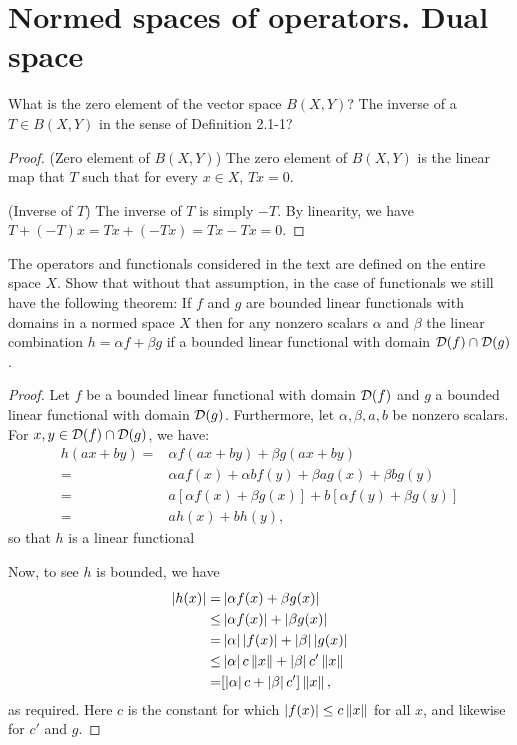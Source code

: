 \section{Normed spaces of operators. Dual space}


\begin{exercise}{1}
What is the zero element of the vector space $B(X,Y)$?
The inverse of a $T\in B(X,Y)$ in the sense of Definition 2.1-1?
\end{exercise}
\begin{proof}
(Zero element of $B(X,Y)$) 
The zero element of $B(X,Y)$ is the linear map that $T$ such that for every $x\in X$, $Tx=0$.

(Inverse of $T$)
The inverse of $T$ is simply $-T$.
By linearity, we have $T + (-T)x= Tx + (-Tx) = Tx - Tx = 0$.
\end{proof}

\begin{exercise}{2}
The operators and functionals considered in the text are defined on the entire space $X$.
Show that without that assumption, in the case of functionals we still have the following theorem:
If $f$ and $g$ are bounded linear functionals with domains in a normed space $X$ then for any nonzero scalars $\alpha$ and $\beta$ the linear combination $h=\alpha f+\beta g$ if a bounded linear functional with domain $\mathcal{D}(f)\cap\mathcal{D}(g)$.
\end{exercise}
\begin{proof}
Let $f$ be a bounded linear functional with domain $\mathcal{D}(f)$ and $g$ a bounded linear functional with domain $\mathcal{D}(g)$.
Furthermore, let $\alpha, \beta, a, b$ be nonzero scalars.
For $x,y \in\mathcal{D}(f)\cap\mathcal{D}(g)$, we have:
\begin{align*}
    h(ax+by) 
    =& \alpha f(ax+by) + \beta g(ax+by)\\
    =& \alpha af(x)+ \alpha bf(y) + \beta ag(x) + \beta bg(y)\\
    =& a[\alpha f(x) + \beta g(x)] + b[\alpha f(y) + \beta g(y)]\\
    =& ah(x) + bh(y),
\end{align*}
so that $h$ is a linear functional

Now, to see $h$ is bounded, we have 
\begin{align*}
    \left\lvert h(x)\right\rvert 
    =& \left\lvert \alpha f(x) + \beta g(x)\right\rvert\\
    \leq& \left\lvert \alpha f(x)\right\rvert + \left\lvert \beta g(x)\right\rvert\\
    =& \left\lvert \alpha\right\rvert\left\lvert f(x)\right\rvert + \left\lvert \beta\right\rvert\left\lvert g(x)\right\rvert\\
    \leq& \left\lvert \alpha\right\rvert c\left\lVert x\right\rVert + \left\lvert \beta\right\rvert c'\left\lVert x\right\rVert\\
    =& [\left\lvert \alpha\right\rvert c + \left\lvert \beta\right\rvert c']\left\lVert x\right\rVert,
\end{align*}
as required.
Here $c$ is the constant for which $\left\lvert f(x)\right\rvert \leq c\left\lVert x\right\rVert$ for all $x$, and likewise for $c'$ and $g$.
\end{proof}

